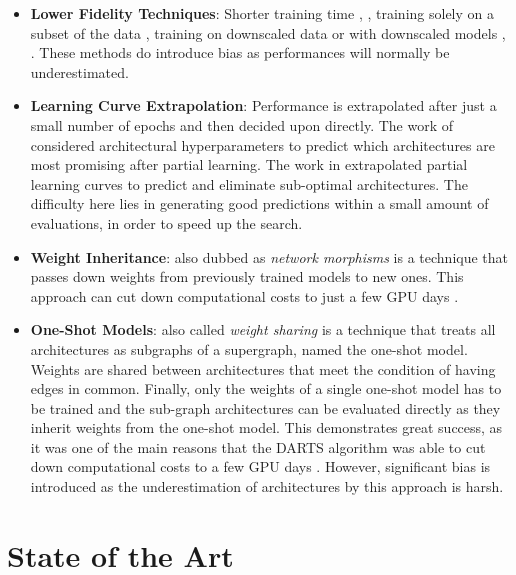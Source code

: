 \documentclass[10pt,        %
               a4paper,     %
               journal,     %
               ]{IEEEtran}
\begin{document}
\begin{itemize}
    \item \textbf{Lower Fidelity Techniques}: Shorter training time \cite{zela2018towards}, \cite{zoph2018learning}, training solely on a
        subset of the data \cite{klein2018towards}, training on downscaled data \cite{chrabaszcz2017downsampled} or with downscaled
        models \cite{zoph2018learning}, \cite{pmlr-v70-real17a}. These methods do introduce bias as performances will normally be
        underestimated.

    \item \textbf{Learning Curve Extrapolation}: Performance is extrapolated after just a small number of epochs and then
        decided upon directly. The work of \cite{klein2018towards} considered architectural hyperparameters to predict which
        architectures are most promising after partial learning. The work in \cite{domhan2015speeding} extrapolated partial
        learning curves to predict and eliminate sub-optimal architectures. The difficulty here lies in generating good
        predictions within a small amount of evaluations, in order to speed up the search.

    \item \textbf{Weight Inheritance}: also dubbed as \textit{network morphisms} is a technique that passes down weights from
        previously trained models to new ones. This approach can cut down computational costs to just a few GPU days
        \cite{cai2018efficient}.

    \item \textbf{One-Shot Models}: also called \textit{weight sharing} is a technique that treats all architectures as subgraphs
        of a supergraph, named the one-shot model. Weights are shared between architectures that meet the condition of
        having edges in common. Finally, only the weights of a single one-shot model has to be trained and the
        sub-graph architectures can be evaluated directly as they inherit weights from the one-shot model. This demonstrates great
        success, as it was one of the main reasons that the DARTS algorithm was able to cut down computational costs
        to a few GPU days \cite{liu2018darts}. However, significant bias is introduced as the underestimation of
        architectures by this approach is harsh.
\end{itemize}

\section{State of the Art}
\label{SOA}
\end{document}
